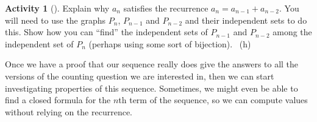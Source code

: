 \documentclass[10pt,]{book}
\theoremstyle{plain}
\theoremstyle{definition}
\theoremstyle{definition}
\theoremstyle{definition}
\newtheorem{activity}[project]{Activity}
\numberwithin{equation}{chapter}
\begin{document}
\begin{activity}[]\label{activity-126}
\hypertarget{p-888}{}%
Explain why \(a_n\) satisfies the recurrence \(a_n = a_{n-1} + a_{n-2}\).  You will need to use the graphs \(P_n\), \(P_{n-1}\) and \(P_{n-2}\) and their independent sets to do this.  Show how you can ``find'' the independent sets of \(P_{n-1}\) and \(P_{n-2}\) among the independent set of \(P_{n}\) (perhaps using some sort of bijection).%
~{\tiny (h)}\end{activity}
\hypertarget{p-890}{}%
Once we have a proof that our sequence really does give the answers to all the versions of the counting question we are interested in, then  we can start investigating properties of this sequence.  Sometimes, we might even be able to find a closed formula for the \(n\)th term of the sequence, so we can compute values without relying on the recurrence.%
\typeout{************************************************}
\typeout{************************************************}
\end{document}
